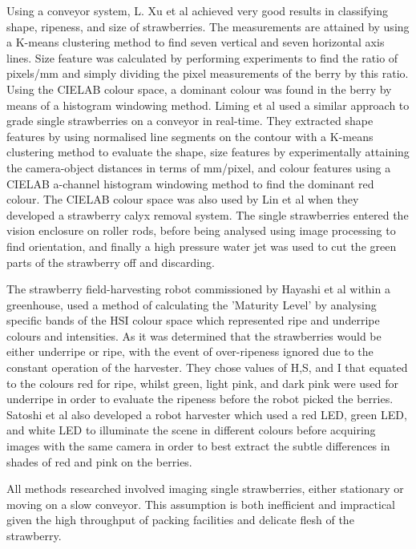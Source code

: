 \documentclass[fleqn,twoside]{article}
\begin{document}
Using a conveyor system, L. Xu et al \cite{xu} achieved very good results in classifying shape, ripeness, and size of strawberries. The measurements are attained by using a K-means clustering method to find seven vertical and seven horizontal axis lines. Size feature was calculated by performing experiments to find the ratio of pixels/mm and simply dividing the pixel measurements of the berry by this ratio. Using the CIELAB colour space, a dominant colour was found in the berry by means of a histogram windowing method. Liming et al \cite{liming} used a similar approach to grade single strawberries on a conveyor in real-time. They extracted shape features by using normalised line segments on the contour with a K-means clustering method to evaluate the shape, size features by experimentally attaining the camera-object distances in terms of mm/pixel, and colour features using a CIELAB a-channel histogram windowing method to find the dominant red colour. The CIELAB colour space was also used by Lin et al \cite{lin} when they developed a strawberry calyx removal system. The single strawberries entered the vision enclosure on roller rods, before being analysed using image processing to find orientation, and finally a high pressure water jet was used to cut the green parts of the strawberry off and discarding.


The strawberry field-harvesting robot commissioned by Hayashi et al \cite{hayashi} within a greenhouse, used a method of calculating the 'Maturity Level' by analysing specific bands of the HSI colour space which represented ripe and underripe colours and intensities. As it was determined that the strawberries would be either underripe or ripe, with the event of over-ripeness ignored due to the constant operation of the harvester. They chose values of H,S, and I that equated to the colours red for ripe, whilst green, light pink, and dark pink were used for underripe in order to evaluate the ripeness before the robot picked the berries. Satoshi et al \cite{yamamoto2} also developed a robot harvester which used a red LED, green LED, and white LED to illuminate the scene in different colours before acquiring images with the same camera in order to best extract the subtle differences in shades of red and pink on the berries. 

All methods researched involved imaging single strawberries, either stationary or moving on a slow conveyor. This assumption is both inefficient and impractical given the high throughput of packing facilities and delicate flesh of the strawberry.
\end{document}
